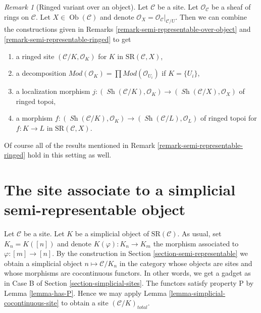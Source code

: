 \documentclass{stacks-project}
\theoremstyle{plain}
\theoremstyle{definition}
\theoremstyle{remark}
\newtheorem{remark}[subsection]{Remark}
\numberwithin{equation}{subsection}
\def\Ob{\mathop{\mathrm{Ob}}\nolimits}
\def\Sh{\mathop{\mathit{Sh}}\nolimits}
\begin{document}
\begin{remark}[Ringed variant over an object]
\label{remark-semi-representable-ringed-over-object}
Let $\mathcal{C}$ be a site. Let $\mathcal{O}_\mathcal{C}$
be a sheaf of rings on $\mathcal{C}$. Let $X \in \Ob(\mathcal{C})$
and denote $\mathcal{O}_X = \mathcal{O}_\mathcal{C}|_{\mathcal{C}/U}$.
Then we can combine the constructions given in
Remarks \ref{remark-semi-representable-over-object}
and \ref{remark-semi-representable-ringed} to get
\begin{enumerate}
\item a ringed site $(\mathcal{C}/K, \mathcal{O}_K)$
for $K$ in $\text{SR}(\mathcal{C}, X)$,
\item a decomposition
$\textit{Mod}(\mathcal{O}_K) =
\prod \textit{Mod}(\mathcal{O}_{U_i})$ if $K = \{U_i\}$,
\item a localization morphism
$j : (\Sh(\mathcal{C}/K), \mathcal{O}_K) \to
(\Sh(\mathcal{C}/X), \mathcal{O}_X)$
of ringed topoi,
\item a morphism
$f : (\Sh(\mathcal{C}/K), \mathcal{O}_K) \to
(\Sh(\mathcal{C}/L), \mathcal{O}_L)$ of ringed topoi
for $f : K \to L$ in $\text{SR}(\mathcal{C}, X)$.
\end{enumerate}
Of course all of the results mentioned in
Remark \ref{remark-semi-representable-ringed}
hold in this setting as well.
\end{remark}





\section{The site associate to a simplicial semi-representable object}
\label{section-simplicial-semi-representable}

\noindent
Let $\mathcal{C}$ be a site. Let $K$ be a simplicial object of
$\text{SR}(\mathcal{C})$. As usual, set $K_n = K([n])$ and denote
$K(\varphi) : K_n \to K_m$ the morphism associated to $\varphi : [m] \to [n]$.
By the construction in
Section \ref{section-semi-representable} we obtain a simplicial object
$n \mapsto \mathcal{C}/K_n$ in the category whose objects are sites and
whose morphisms are cocontinuous functors. In other words, we get
a gadget as in Case B of Section \ref{section-simplicial-sites}.
The functors satisfy property P by Lemma \ref{lemma-has-P}.
Hence we may apply
Lemma \ref{lemma-simplicial-cocontinuous-site}
to obtain a site $(\mathcal{C}/K)_{total}$.
\end{document}
